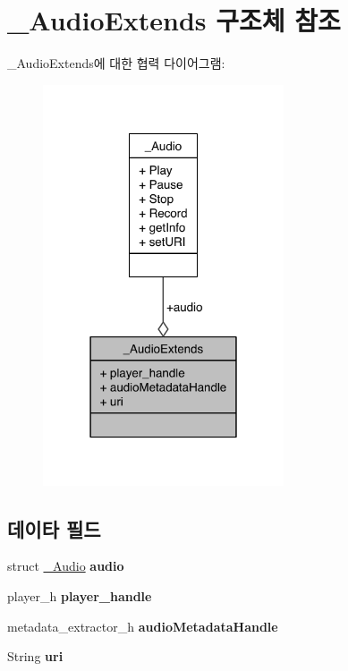 \hypertarget{struct___audio_extends}{\section{\-\_\-\-Audio\-Extends 구조체 참조}
\label{struct___audio_extends}
}


\-\_\-\-Audio\-Extends에 대한 협력 다이어그램\-:\nopagebreak
\begin{figure}[H]
\begin{center}
\leavevmode
\includegraphics[width=202pt]{d2/d4b/struct___audio_extends__coll__graph}
\end{center}
\end{figure}
\subsection*{데이타 필드}
\begin{DoxyCompactItemize}
\item 
\hypertarget{struct___audio_extends_a5fd9dfc5896f2475249e5814bc957cd3}{struct \hyperlink{struct___audio}{\-\_\-\-Audio} {\bfseries audio}}\label{struct___audio_extends_a5fd9dfc5896f2475249e5814bc957cd3}

\item 
\hypertarget{struct___audio_extends_acdbf0738be9fa70a60412d48cad881ee}{player\-\_\-h {\bfseries player\-\_\-handle}}\label{struct___audio_extends_acdbf0738be9fa70a60412d48cad881ee}

\item 
\hypertarget{struct___audio_extends_afb8274c680a31f19a7967b768e11ba52}{metadata\-\_\-extractor\-\_\-h {\bfseries audio\-Metadata\-Handle}}\label{struct___audio_extends_afb8274c680a31f19a7967b768e11ba52}

\item 
\hypertarget{struct___audio_extends_ac0b02717b928a36338653c49b0821365}{String {\bfseries uri}}\label{struct___audio_extends_ac0b02717b928a36338653c49b0821365}

\end{DoxyCompactItemize}



